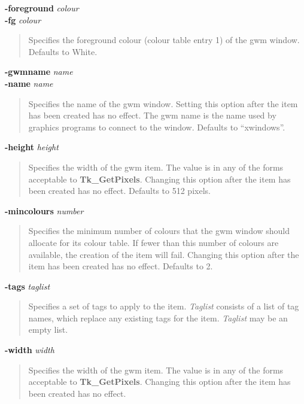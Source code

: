 \documentclass[twoside,11pt,nolof]{starlink}
\newenvironment{rquote}{\begin{quote}\raggedright}{\end{quote}}
\begin{document}
\textbf{-foreground} \emph{colour}\\
\textbf{-fg} \emph{colour}
\begin{rquote}
Specifies the foreground colour (colour table entry 1) of the gwm window.
Defaults to White.
\end{rquote}

\textbf{-gwmname} \emph{name}\\
\textbf{-name} \emph{name}
\begin{rquote}
Specifies the name of the gwm window. Setting
this option after the item has been created has no effect. The gwm name
is the name used by graphics programs to connect to the window. Defaults
to ``xwindows''.
\end{rquote}

\textbf{-height} \emph{height}
\begin{rquote}
Specifies the width of the gwm item. The value is in any of the forms
acceptable to \textbf{Tk\_GetPixels}. Changing this option after the item
has been created has no effect. Defaults to 512 pixels.
\end{rquote}

\textbf{-mincolours} \emph{number}
\begin{rquote}
Specifies the minimum number of colours that the gwm window should allocate
for its colour table. If fewer than this number of colours are available,
the creation of the item will fail. Changing this option after the item
has been created has no effect. Defaults to 2.
\end{rquote}

%

\textbf{-tags} \emph{taglist}
\begin{rquote}
Specifies a set of tags to apply to the item. \emph{Taglist} consists
of a list of tag names, which replace any existing tags for the item.
\emph{Taglist} may be an empty list.
\end{rquote}

\textbf{-width} \emph{width}
\begin{rquote}
Specifies the width of the gwm item. The value is in any of the forms
acceptable to \textbf{Tk\_GetPixels}. Changing this option after the item
has been created has no effect.
\end{rquote}
\end{document}
